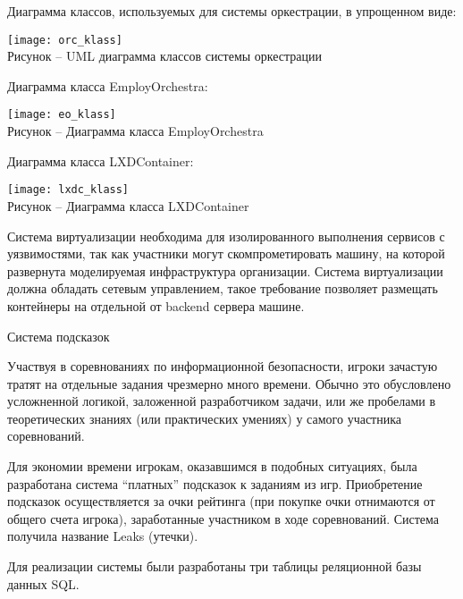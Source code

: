 Диаграмма классов, используемых для системы оркестрации, в упрощенном виде:
\begin{center}
\texttt{[image: orc\_klass]}\\
Рисунок -- UML диаграмма классов системы оркестрации \\
\end{center}
\vspace{\baselineskip}

Диаграмма класса EmployOrchestra:
\begin{center}
\texttt{[image: eo\_klass]}\\
Рисунок -- Диаграмма класса EmployOrchestra \\
\end{center}
\vspace{\baselineskip}

Диаграмма класса LXDContainer:
\begin{center}
\texttt{[image: lxdc\_klass]}\\
Рисунок -- Диаграмма класса LXDContainer \\
\end{center}
\vspace{\baselineskip}

Система виртуализации необходима для изолированного выполнения сервисов с уязвимостями, так как участники могут скомпрометировать машину, на которой развернута моделируемая инфраструктура организации. Система виртуализации должна обладать сетевым управлением, такое требование позволяет размещать контейнеры на отдельной от backend сервера машине.\par

\begin{center}
Система подсказок
\end{center}
Участвуя в соревнованиях по информационной безопасности, игроки зачастую тратят на отдельные задания чрезмерно много времени. Обычно это обусловлено усложненной логикой, заложенной разработчиком задачи, или же пробелами в теоретических знаниях (или практических умениях) у самого участника соревнований.\par
Для экономии времени игрокам, оказавшимся в подобных ситуациях, была разработана система “платных” подсказок к заданиям из игр. Приобретение подсказок осуществляется за очки рейтинга (при покупке очки отнимаются от общего счета игрока), заработанные участником в ходе соревнований. Система получила название Leaks (утечки).\par
Для реализации системы были разработаны три таблицы реляционной базы данных SQL.\par


